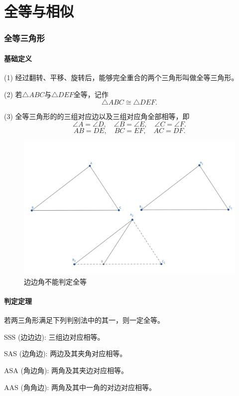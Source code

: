 \part{全等与相似}
\section{全等三角形}
\subsection{基础定义}
\begin{definition}[全等关系]
    (1) 经过翻转、平移、旋转后，能够完全重合的两个三角形叫做全等三角形。
    
    (2) 若$\triangle ABC$与$\triangle DEF$全等，记作
    $$\triangle ABC \cong \triangle DEF.$$

    (3) 全等三角形的的三组对应边以及三组对应角全部相等，即
    $$\angle A = \angle D, \quad \angle B = \angle E, \quad \angle C = \angle F.$$
    $$AB = DE, \quad BC =EF, \quad AC=DF.$$
\end{definition}

\begin{figure}[h]
    \centering
    \includegraphics[width=\linewidth]{figures/全等三角形.png}
    \caption{边边角不能判定全等}
\end{figure}


\subsection{判定定理}
\begin{theorem}[全等三角形判定定理]
    若两三角形满足下列判别法中的其一，则一定全等。
    
    SSS (边边边): 三组边对应相等。

    SAS (边角边): 两边及其夹角对应相等。

    ASA (角边角): 两角及其夹边对应相等。

    AAS (角角边): 两角及其中一角的对边对应相等。
\end{theorem}

